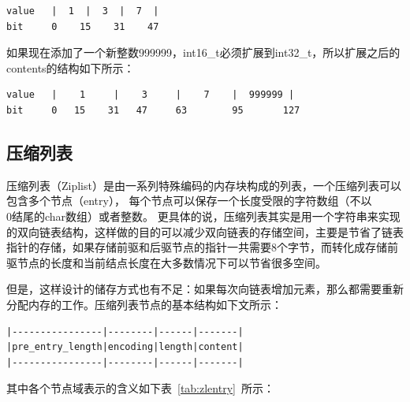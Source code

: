 \documentclass{zjutthesis}
\begin{document}
\begin{verbatim}
value   |  1  |  3  |  7  |
bit     0    15    31    47
\end{verbatim}
如果现在添加了一个新整数999999，int16\_t必须扩展到int32\_t，所以扩展之后的contents的结构如下所示：
\begin{verbatim}
value   |    1     |    3     |    7    |  999999 |
bit     0   15    31   47     63        95       127
\end{verbatim}

\subsection{压缩列表}
压缩列表（Ziplist）是由一系列特殊编码的内存块构成的列表，一个压缩列表可以包含多个节点（entry）， 每个节点可以保存一个长度受限的字符数组（不以\\0结尾的char数组）或者整数。
更具体的说，压缩列表其实是用一个字符串来实现的双向链表结构，这样做的目的可以减少双向链表的存储空间，主要是节省了链表指针的存储，如果存储前驱和后驱节点的指针一共需要8个字节，而转化成存储前驱节点的长度和当前结点长度在大多数情况下可以节省很多空间。

但是，这样设计的储存方式也有不足：如果每次向链表增加元素，那么都需要重新分配内存的工作。压缩列表节点的基本结构如下文所示：
\begin{verbatim}
|----------------|--------|------|-------|
|pre_entry_length|encoding|length|content|
|----------------|--------|------|-------|
\end{verbatim}
其中各个节点域表示的含义如下表~\ref{tab:zlentry}~所示：

\begin{table}[htbp]
\caption{压缩列表节点}\label{tab:zlentry}
\vspace{\baselineskip}
\end{table}
\end{document}
